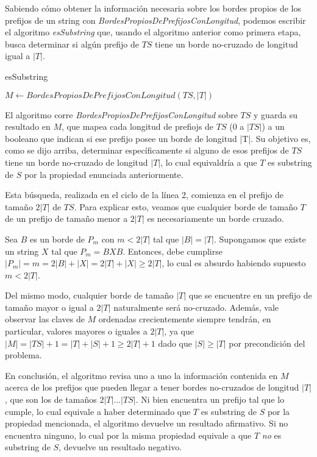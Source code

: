 Sabiendo cómo obtener la información necesaria sobre los bordes propios de los prefijos de un string con \textit{BordesPropiosDePrefijosConLongitud}, podemos escribir el algoritmo \textit{esSubstring} que, usando el algoritmo anterior como primera etapa, busca determinar si algún prefijo de $TS$ tiene un borde no-cruzado de longitud igual a $|T|$.

\bigskip

\begin{algorithm}[H]
	\caption{esSubstring}

	$M \gets \mathit{BordesPropiosDePrefijosConLongitud}(TS, |T|)$
	
	 {
		 {
		}
	}

\end{algorithm}

\bigskip

El algoritmo corre \textit{BordesPropiosDePrefijosConLongitud} sobre $TS$ y guarda su resultado en $M$, que mapea cada longitud de prefiojs de $TS$ ($0$ a $|TS|$) a un booleano que indican si ese prefijo posee un borde de longitud |T|. Su objetivo es, como se dijo arriba, determinar específicamente si alguno de esos prefijos de $TS$ tiene un borde no-cruzado de longitud $|T|$, lo cual equivaldría a que $T$ es substring de $S$ por la propiedad enunciada anteriormente.

Esta búsqueda, realizada en el ciclo de la línea 2, comienza en el prefijo de tamaño $2|T|$ de $TS$. Para explicar esto, veamos que cualquier borde de tamaño $T$ de un prefijo de tamaño menor a $2|T|$ es necesariamente un borde cruzado.

Sea $B$ es un borde de $P_m$ con $m < 2|T|$ tal que $|B| = |T|$. Supongamos que existe un string $X$ tal que $P_m = BXB$. Entonces, debe cumplirse $|P_m| = m = 2|B|+|X| = 2|T| + |X| \geq 2|T|$, lo cual es absurdo habiendo supuesto $m < 2|T|$.

Del mismo modo, cualquier borde de tamaño $|T|$ que se encuentre en un prefijo de tamaño mayor o igual a $2|T|$ naturalmente será no-cruzado. Además, vale observar las claves de $M$ ordenadas crecientemente siempre tendrán, en particular, valores mayores o iguales a $2|T|$, ya que $|M| = |TS|+1 = |T|+|S|+1 \geq 2|T| + 1$ dado que $|S| \geq |T|$ por precondición del problema.

En conclusión, el algoritmo revisa uno a uno la información contenida en $M$ acerca de los prefijos que pueden llegar a tener bordes no-cruzados de longitud $|T|$, que son los de tamaños $2|T| \dots |TS|$. Ni bien encuentra un prefijo tal que lo cumple, lo cual equivale a haber determinado que $T$ es substring de $S$ por la propiedad mencionada, el algoritmo devuelve un resultado afirmativo. Si no encuentra ninguno, lo cual por la misma propiedad equivale a que $T$ \textit{no} es substring de $S$, devuelve un resultado negativo.
 
